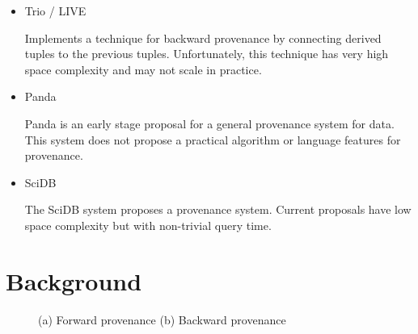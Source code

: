 \documentclass{article}
\begin{document}
\begin{itemize}
\item Trio / LIVE \cite{widom2005trio, sarma2010live} 
  
Implements a technique for backward provenance by connecting derived tuples to the previous tuples. Unfortunately, this technique has very high space complexity and may not scale in practice. 

\item Panda \cite{ikeda2010panda} 

Panda is an early stage proposal for a general provenance system for data. This system does not propose a practical algorithm or language features for provenance. 

\item SciDB \cite{cudré2009demonstration}

The SciDB system proposes a provenance system. Current proposals have low space complexity but with non-trivial query time. 

\end{itemize}

\section{Background}

\begin{figure}
  \centering
  \label{diag}

  \caption{(a) Forward provenance (b) Backward provenance}

\end{figure}
\end{document}
